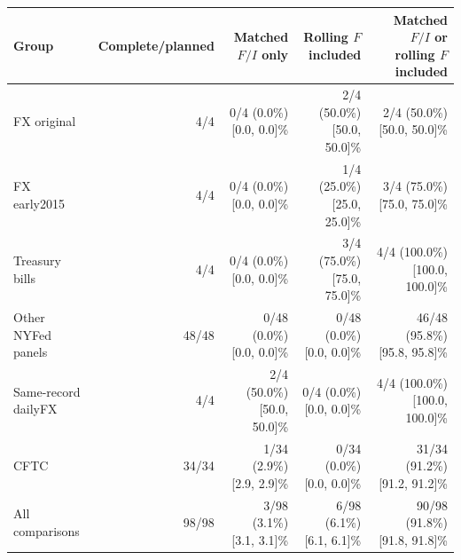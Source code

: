 \begin{center}\small\begin{tabular}{lrrrr}
\toprule
Group & Complete/planned & Matched $F/I$ only & Rolling $F$ included & Matched $F/I$ or rolling $F$ included \\
\midrule
FX original & 4/4 & \shortstack{0/4 (0.0\%)\\{}[0.0, 0.0]\%} & \shortstack{2/4 (50.0\%)\\{}[50.0, 50.0]\%} & \shortstack{2/4 (50.0\%)\\{}[50.0, 50.0]\%} \\
FX early2015 & 4/4 & \shortstack{0/4 (0.0\%)\\{}[0.0, 0.0]\%} & \shortstack{1/4 (25.0\%)\\{}[25.0, 25.0]\%} & \shortstack{3/4 (75.0\%)\\{}[75.0, 75.0]\%} \\
Treasury bills & 4/4 & \shortstack{0/4 (0.0\%)\\{}[0.0, 0.0]\%} & \shortstack{3/4 (75.0\%)\\{}[75.0, 75.0]\%} & \shortstack{4/4 (100.0\%)\\{}[100.0, 100.0]\%} \\
Other NYFed panels & 48/48 & \shortstack{0/48 (0.0\%)\\{}[0.0, 0.0]\%} & \shortstack{0/48 (0.0\%)\\{}[0.0, 0.0]\%} & \shortstack{46/48 (95.8\%)\\{}[95.8, 95.8]\%} \\
Same-record dailyFX & 4/4 & \shortstack{2/4 (50.0\%)\\{}[50.0, 50.0]\%} & \shortstack{0/4 (0.0\%)\\{}[0.0, 0.0]\%} & \shortstack{4/4 (100.0\%)\\{}[100.0, 100.0]\%} \\
CFTC & 34/34 & \shortstack{1/34 (2.9\%)\\{}[2.9, 2.9]\%} & \shortstack{0/34 (0.0\%)\\{}[0.0, 0.0]\%} & \shortstack{31/34 (91.2\%)\\{}[91.2, 91.2]\%} \\
All comparisons & 98/98 & \shortstack{3/98 (3.1\%)\\{}[3.1, 3.1]\%} & \shortstack{6/98 (6.1\%)\\{}[6.1, 6.1]\%} & \shortstack{90/98 (91.8\%)\\{}[91.8, 91.8]\%} \\
\bottomrule
\end{tabular}\end{center}
\endgroup
